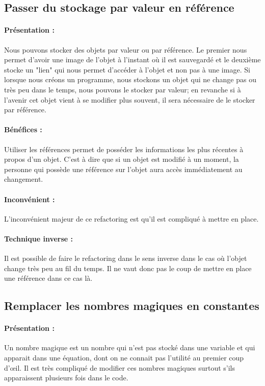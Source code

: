 \documentclass[a4paper,twoside,12pt,openright]{report}
\begin{document}
\subsection{Passer du stockage par valeur en référence}
\paragraph{Présentation :}
Nous pouvons stocker des objets par valeur ou par référence. Le premier nous permet d'avoir une image de l'objet à l'instant où il est sauvegardé et le deuxième stocke un "lien" qui nous permet d'accéder à l'objet et non pas à une image.
Si lorsque nous créons un programme, nous stockons un objet qui ne change pas ou très peu dans le temps, nous pouvons le stocker par valeur; en revanche si à l'avenir cet objet vient à se modifier plus souvent, il sera nécessaire de le stocker par référence.

\paragraph{Bénéfices :}
Utiliser les références permet de posséder les informations les plus récentes à propos d'un objet. C'est à dire que si un objet est modifié à un moment, la personne qui possède une référence sur l'objet aura accès immédiatement au changement.

\paragraph{Inconvénient :}
L'inconvénient majeur de ce refactoring est qu'il est compliqué à mettre en place.

\paragraph{Technique inverse :}
Il est possible de faire le refactoring dans le sens inverse dans le cas où l'objet change très peu au fil du temps. Il ne vaut donc pas le coup de mettre en place une référence dans ce cas là.\\


\subsection{Remplacer les nombres magiques en constantes}
\paragraph{Présentation :}
Un nombre magique est un nombre qui n'est pas stocké dans une variable et qui apparait dans une équation, dont on ne connait pas l'utilité au premier coup d'œil. Il est très compliqué de modifier ces nombres magiques surtout s'ils apparaissent plusieurs fois dans le code.
\end{document}
